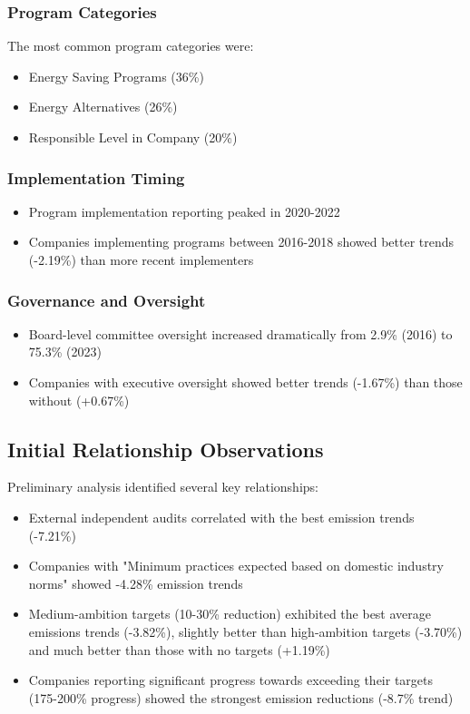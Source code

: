 \documentclass[11pt,a4paper]{article}
\begin{document}
\subsubsection{Program Categories}
The most common program categories were:
\begin{itemize}
    \item Energy Saving Programs (36\%)
    \item Energy Alternatives (26\%)
    \item Responsible Level in Company (20\%)
\end{itemize}

\subsubsection{Implementation Timing}
\begin{itemize}
    \item Program implementation reporting peaked in 2020-2022
    \item Companies implementing programs between 2016-2018 showed better trends (-2.19\%) than more recent implementers
\end{itemize}

\subsubsection{Governance and Oversight}
\begin{itemize}
    \item Board-level committee oversight increased dramatically from 2.9\% (2016) to 75.3\% (2023)
    \item Companies with executive oversight showed better trends (-1.67\%) than those without (+0.67\%)
\end{itemize}

\subsection{Initial Relationship Observations}
Preliminary analysis identified several key relationships:

\begin{itemize}
    \item External independent audits correlated with the best emission trends (-7.21\%)
    \item Companies with "Minimum practices expected based on domestic industry norms" showed -4.28\% emission trends
    \item Medium-ambition targets (10-30\% reduction) exhibited the best average emissions trends (-3.82\%), slightly better than high-ambition targets (-3.70\%) and much better than those with no targets (+1.19\%)
    \item Companies reporting significant progress towards exceeding their targets (175-200\% progress) showed the strongest emission reductions (-8.7\% trend)
\end{itemize}
\end{document}
